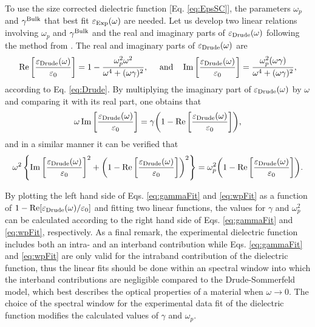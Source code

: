 To use the size corrected dielectric function [Eq. \eqref{eq:EpsSC}], the parameters  $\omega_p$ and $\gamma^\text{\scriptsize Bulk}$ that best fit  $\varepsilon_\text{\scriptsize Exp}(\omega)$ are needed. Let us develop two linear relations involving $\omega_p$ and $\gamma^\text{\scriptsize Bulk}$ and the real and imaginary parts of $\varepsilon_\text{\scriptsize Drude}(\omega)$ following the method from \citeauthor{mendoza_herrera_determination_2014} \cite{mendoza_herrera_determination_2014}. The real and imaginary parts of $\varepsilon_\text{\scriptsize Drude}(\omega)$ are
%
\begin{align}
\Re\qty[\frac{\varepsilon_\text{\scriptsize Drude}(\omega)}{\varepsilon_0}] = 1 - \frac{\omega_p^2 \omega^2}{\omega^4 + (\omega\gamma)^2},
\qqtext{ and}
\Im\qty[\frac{\varepsilon_\text{\scriptsize Drude}(\omega)}{\varepsilon_0}]  = \frac{\omega_p^2  (\omega\gamma)}{\omega^4 + (\omega\gamma)^2},
\end{align}
%
according to Eq. \eqref{eq:Drude}. By multiplying the imaginary part of $\varepsilon_\text{\scriptsize Drude}(\omega)$ by $\omega$ and comparing it with its real part, one obtains that
%
\begin{align}
\omega \Im\qty[\frac{\varepsilon_\text{\scriptsize Drude}(\omega)}{\varepsilon_0}] =
 \gamma \qty(1 - \Re\qty[\frac{\varepsilon_\text{\scriptsize Drude}(\omega)}{\varepsilon_0}]),
\label{eq:gammaFit}
\end{align}
%
and in a similar manner it can be verified that
\begin{align}
\omega^2\left\{ \Im\qty[\frac{\varepsilon_\text{\scriptsize Drude}(\omega)}{\varepsilon_0}]^2
			+ \qty(1-\Re\qty[\frac{\varepsilon_\text{\scriptsize Drude}(\omega)}{\varepsilon_0}])^2 \right\}
 = \omega_p^2 \qty(1 - \Re\qty[\frac{\varepsilon_\text{\scriptsize Drude}(\omega)}{\varepsilon_0}]).
 \label{eq:wpFit}
\end{align}


By plotting the left hand side of Eqs. \eqref{eq:gammaFit} and \eqref{eq:wpFit} as a function of  $1-\Re[\varepsilon_\text{\scriptsize Drude}(\omega)/\varepsilon_0]$ and fitting two linear functions, the values for $\gamma$ and $\omega_p^2$ can be calculated according to the right hand side of Eqs. \eqref{eq:gammaFit} and \eqref{eq:wpFit}, respectively. As a final remark, the experimental dielectric function includes both an intra- and an interband contribution  while  Eqs. \eqref{eq:gammaFit} and \eqref{eq:wpFit} are only valid for the intraband contribution of the dielectric function, thus the linear fits should be done within an spectral window into which the interband contributions are negligible compared to the Drude-Sommerfeld model, which best describes the optical properties of a material  when $\omega\to 0$. The  choice of the spectral window for the experimental data fit of the dielectric function modifies the calculated values of $\gamma$ and $\omega_p$.

